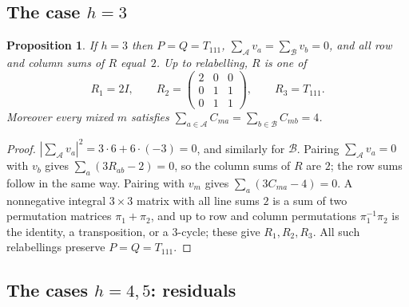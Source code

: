 \documentclass[11pt,a4paper]{amsart}
\newtheorem{proposition}[theorem]{Proposition}
\theoremstyle{definition}
\theoremstyle{remark}
\newcommand{\cA}{\mathcal{A}}
\newcommand{\cB}{\mathcal{B}}
\begin{document}
\subsection{The case \texorpdfstring{$h=3$}{h=3}}

\begin{proposition}\label{prop:h3}
If $h=3$ then $P=Q=T_{111}$, $\sum_\cA v_a=\sum_\cB v_b=0$, and all row and column sums of $R$ equal~$2$.
Up to relabelling, $R$ is one of
\[
R_1=2I,\qquad R_2=\begin{pmatrix}2&0&0\\0&1&1\\0&1&1\end{pmatrix},\qquad R_3=T_{111}.
\]
Moreover every mixed $m$ satisfies $\sum_{a\in\cA}C_{ma}=\sum_{b\in\cB}C_{mb}=4$.
\end{proposition}

\begin{proof}
$|\sum_\cA v_a|^2=3\cdot6+6\cdot(-3)=0$, and similarly for $\cB$. Pairing $\sum_\cA v_a=0$ with $v_b$
gives $\sum_a(3R_{ab}-2)=0$, so the column sums of $R$ are $2$; the row sums follow in the same way.
Pairing with $v_m$ gives $\sum_a(3C_{ma}-4)=0$. A nonnegative integral $3\times3$ matrix with all line
sums $2$ is a sum of two permutation matrices $\pi_1+\pi_2$, and up to row and column permutations
$\pi_1^{-1}\pi_2$ is the identity, a transposition, or a $3$-cycle; these give $R_1,R_2,R_3$. All such
relabellings preserve $P=Q=T_{111}$.
\end{proof}

\subsection{The cases \texorpdfstring{$h=4,5$}{h=4,5}: residuals}
\end{document}
